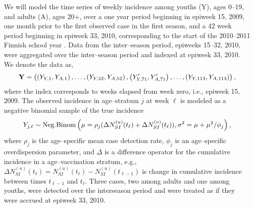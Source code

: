 We will model the time series of weekly incidence among youths (Y), ages 0--19, and adults (A), ages 20+, over a one year period beginning in epiweek 15, 2009, one month prior to the first observed case in the first season, and a 42 week period beginning in epiweek 33, 2010, corresponding to the start of the 2010--2011 Finnish school year \cite{calendarFinland}. Data from the inter--season period, epiweeks 15--32, 2010, were aggregated over the inter--season period and indexed at epiweek 33, 2010. We denote the data as, $$ \mathbf{Y} = \left (\left (Y_{Y,1},Y_{A,1}\right ),\dots,\left (Y_{Y,52},Y_{A,52}\right ),\left (Y^\prime_{Y,71},Y^\prime_{A,71}\right ),\dots,\left (Y_{Y,113},Y_{A,113}\right )\right ), $$ where the index corresponds to weeks elapsed from week zero, i.e., epiweek 15, 2009. The observed incidence in age--stratum $ j $ at week $ \ell $ is modeled as a negative binomial sample of the true incidence \begin{equation}
\label{flu_emit_prob}
Y_{j,\ell} \sim \mathrm{Neg.Binom}\left (\mu = \rho_j(\Delta N_{SI}^{(u)}(t_\ell) + \Delta N_{SI}^{(v)}(t_\ell)), \sigma^2 = \mu + \mu^2 / \phi_j\right ),
\end{equation}
where $ \rho_j $ is the age--specific mean case detection rate, $ \phi_j $ is an age--specific overdispersion parameter, and $ \Delta $ is a difference operator for the cumulative incidence in a age--vaccination stratum, e.g., $ \Delta N_{SI}^{(u)}(t_\ell) = N_{SI}^{(u)}(t_\ell) - N_{SI}^{(u)}(t_{\ell-1}) $ is change in cumulative incidence between times $ t_{\ell-1} $ and $ t_\ell $. Three cases, two among adults and one among youths, were detected over the interseason period and were treated as if they were accrued at epiweek 33, 2010. 


